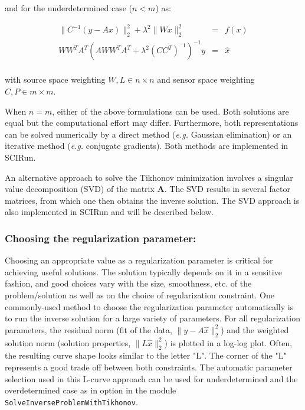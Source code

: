 \noindent and for the underdetermined case ($n < m$) as:

\begin{center}
\begin{eqnarray}
   \| C^{-1} (y - A x) \|^{2}_{2} + \lambda^{2} \| Wx \|^{2}_{2} &=& f(x)
\nonumber\\
   W {W}^{T} A^{T} (A W {W}^{T} A^{T} + \lambda^{2} (C
C^{T})^{^-1})^{-1} y &=& \hat{x} \\
\label{tik_problem_underdet}
\end{eqnarray}
\end{center}
\noindent with source space weighting $ W,L \in n \times n $ and sensor space
weighting $ C,P \in m \times m $. 

When $n=m$, either of the above formulations can be used. 
Both solutions are equal but the computational effort may differ. Furthermore, both representations can be solved numerically by a direct method (\textit{e.g.} Gaussian elimination) or an iterative method (\textit{e.g.} conjugate gradients). Both methods are implemented in SCIRun.

An alternative approach to solve the Tikhonov minimization involves a singular value
decomposition (SVD) of the matrix $\mathbf{A}$. The SVD results in several factor matrices, from which one then obtains the inverse solution. The SVD approach is also implemented in SCIRun and will be described below.

\subsubsection{Choosing the regularization parameter:}

Choosing an appropriate value as a regularization parameter is critical for achieving useful solutions.
The solution typically depends on it in a sensitive fashion, and good
choices vary with the size, smoothness, etc. of the problem/solution as well as on the
choice of regularization constraint. One commonly-used method to choose the
regularization parameter automatically is to run the inverse solution for a
large variety of parameters. For all regularization parameters, the residual
norm (fit of the data, $\| y - A \hat{x} \|^{2}_{2} $) and the weighted
solution norm (solution properties, $\|L\hat{x} \|^{2}_{2}$) is plotted in a log-log plot. Often,
the resulting curve shape looks similar to the letter
"L". The corner of the "L" represents a good trade off between both
constraints. The automatic parameter selection used in this L-curve approach
can be used for underdetermined and the overdetermined case as in option in
the module {\tt SolveInverseProblemWithTikhonov}.

